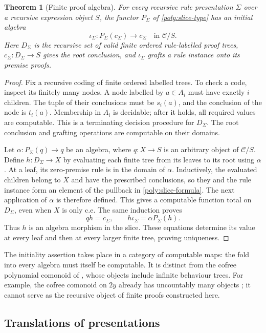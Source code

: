 \documentclass[11pt]{article}
\newtheorem{theorem}{Theorem}[section]
\theoremstyle{definition}
\theoremstyle{remark}
\begin{document}
\begin{theorem}[Finite proof algebra]\label{poly:initial}
For every recursive rule presentation $\Sigma$ over a recursive
expression object $S$, the functor $P_\Sigma$ of
\eqref{poly:slice-type} has an initial algebra
\[
 \iota_\Sigma:P_\Sigma(c_\Sigma)\longrightarrow c_\Sigma
 \quad\text{in }\mathscr C/S.
\]
Here $D_\Sigma$ is the recursive set of valid finite ordered
rule-labelled proof trees, $c_\Sigma:D_\Sigma\to S$ gives the root
conclusion, and $\iota_\Sigma$ grafts a rule instance onto its premise
proofs.
\end{theorem}
\begin{proof}
Fix a recursive coding of finite ordered labelled trees. To check a
code, inspect its finitely many nodes. A node labelled by $a\in A_i$
must have exactly $i$ children. The tuple of their conclusions must be
$s_i(a)$, and the conclusion of the node is $t_i(a)$. Membership in
$A_i$ is decidable; after it holds, all required values are computable.
This is a terminating decision procedure for $D_\Sigma$. The root
conclusion and grafting operations are computable on their domains.

Let $\alpha:P_\Sigma(q)\to q$ be an algebra, where $q:X\to S$ is an
arbitrary object of $\mathscr C/S$. Define $h:D_\Sigma\to X$ by
evaluating each finite tree from its leaves to its root using
$\alpha$. At a leaf, its zero-premise rule is in the domain of
$\alpha$. Inductively, the evaluated children belong to $X$ and have
the prescribed conclusions, so they and the rule instance form an
element of the pullback in \eqref{poly:slice-formula}. The next
application of $\alpha$ is therefore defined. This gives a
computable function total on $D_\Sigma$, even when $X$ is only c.e.
The same induction proves
\[
 qh=c_\Sigma,\qquad
 h\iota_\Sigma=\alpha P_\Sigma(h).
\]
Thus $h$ is an algebra morphism in the slice. These equations determine
its value at every leaf and then at every larger finite tree, proving
uniqueness.
\end{proof}

The initiality assertion takes place in a category of computable maps:
the fold into every algebra must itself be computable. It is distinct
from the cofree polynomial comonoid of
\cite[Theorem~8.45]{NS2024}, whose objects include infinite behaviour
trees. For example, the cofree comonoid on $2y$ already has uncountably
many objects \cite[Example~8.10]{NS2024}; it cannot serve as the
recursive object of finite proofs constructed here.

\subsection{Translations of presentations}\label{poly:translations}
\end{document}
